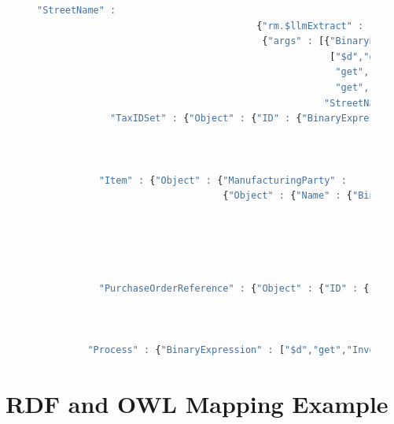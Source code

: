 \documentclass[10pt,letterpaper]{article} %
\begin{document}
\begin{figure}[H]
\begin{lstlisting}[language=JavaScript,basicstyle=\ttfamily\scriptsize,numberstyle=\scriptsize]
                                       "StreetName" :
                                       {"rm.$llmExtract" :
                                        {"args" : [{"BinaryExpression" :
                                                    ["$d","get","Invoice","get","DataArea","get","Invoice",
                                                     "get","InvoiceLine","get","BuyerParty","get","Location",
                                                     "get","Address","get","AddressLine"]},
                                                   "StreetName"]}}}}}},
             "TaxIDSet" : {"Object" : {"ID" : {"BinaryExpression" : ["$d","get","Invoice","get","DataArea",
                                                                     "get","Invoice","get","InvoiceLine",
                                                                     "get","BuyerParty",
                                                                     "get","TaxIDSet","get","ID"]}}}}},
           "Item" : {"Object" : {"ManufacturingParty" :
                                 {"Object" : {"Name" : {"BinaryExpression" : ["$d","get","Invoice",
                                                                              "get","DataArea",
                                                                              "get","Invoice","get","InvoiceLine",
                                                                              "get","Item",
                                                                              "get","ManufacturingParty",
                                                                              "get","Name"]}}}}},
           "PurchaseOrderReference" : {"Object" : {"ID" : {"BinaryExpression" :
                                                           ["$d","get","Invoice","get","DataArea","get","Invoice",
                                                            "get","InvoiceHeader","get","PurchaseOrderReference",
                                                            "get","ID"]}}}}},
         "Process" : {"BinaryExpression" : ["$d","get","Invoice","get","DataArea","get","Process"]}}}}}}}}}}
\end{lstlisting}
\end{figure}  \vspace{-3em}

 \appendix
 \pagebreak

 \renewcommand{\thesection}{Appendix \Alph{section}} %

\section{RDF and OWL Mapping Example}
\end{document}
